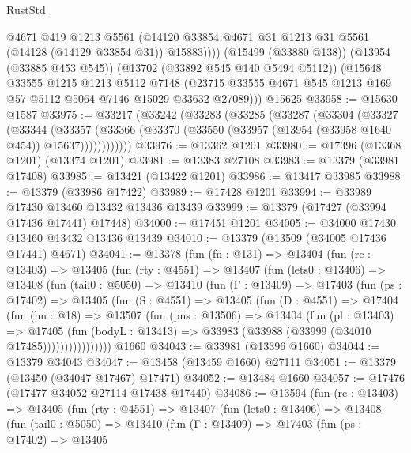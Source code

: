 \begin{lexlean}{RustStd}
\begin{coremodule}
            @4671
            @419
            @1213
            @5561
            (@14120 @33854 @4671 @31 @1213 @31 @5561 (@14128 (@14129 @33854 @31)) @15883))))
      (@15499 (@33880 @138))
      (@13954 (@33885 @453 @545))
      (@13702 (@33892 @545 @140 @5494 @5112))
      (@15648
        @33555
        @1215
        @1213
        @5112
        @7148
        (@23715 @33555 @4671 @545 @1213 @169 @57 @5112 @5064 @7146 @15029 @33632 @27089)))
    @15625
@33958 := @15630 @1587
@33975 := @33217
    (@33242
      (@33283
        (@33285
          (@33287
            (@33304
              (@33327
                (@33344
                  (@33357
                    (@33366 (@33370 (@33550 (@33957 (@13954 (@33958 @1640 @454)) @15637))))))))))))
@33976 := @13362 @1201
@33980 := @17396 (@13368 @1201) (@13374 @1201)
@33981 := @13383 @27108
@33983 := @13379 (@33981 @17408)
@33985 := @13421 (@13422 @1201)
@33986 := @13417 @33985
@33988 := @13379 (@33986 @17422)
@33989 := @17428 @1201
@33994 := @33989 @17430 @13460 @13432 @13436 @13439
@33999 := @13379 (@17427 (@33994 @17436 @17441) @17448)
@34000 := @17451 @1201
@34005 := @34000 @17430 @13460 @13432 @13436 @13439
@34010 := @13379 (@13509 (@34005 @17436 @17441) @4671)
@34041 := @13378
    (fun (fn : @131) =>
    @13404
      (fun (rc : @13403) =>
      @13405
        (fun (rty : @4551) =>
        @13407
          (fun (lets0 : @13406) =>
          @13408
            (fun (tail0 : @5050) =>
            @13410
              (fun (Γ : @13409) =>
              @17403
                (fun (ps : @17402) =>
                @13405
                  (fun (S : @4551) =>
                  @13405
                    (fun (D : @4551) =>
                    @17404
                      (fun (hn : @18) =>
                      @13507
                        (fun (pns : @13506) =>
                        @13404
                          (fun (pl : @13403) =>
                          @17405
                            (fun (bodyL : @13413) =>
                            @33983 (@33988 (@33999 (@34010 @17485))))))))))))))))
    @1660
@34043 := @33981 (@13396 @1660)
@34044 := @13379 @34043
@34047 := @13458 (@13459 @1660) @27111
@34051 := @13379 (@13450 (@34047 @17467) @17471)
@34052 := @13484 @1660
@34057 := @17476 (@17477 @34052 @27114 @17438 @17440)
@34086 := @13594
    (fun (rc : @13403) =>
    @13405
      (fun (rty : @4551) =>
      @13407
        (fun (lets0 : @13406) =>
        @13408
          (fun (tail0 : @5050) =>
          @13410
            (fun (Γ : @13409) =>
            @17403
              (fun (ps : @17402) =>
              @13405

\end{coremodule}
\end{lexlean}
